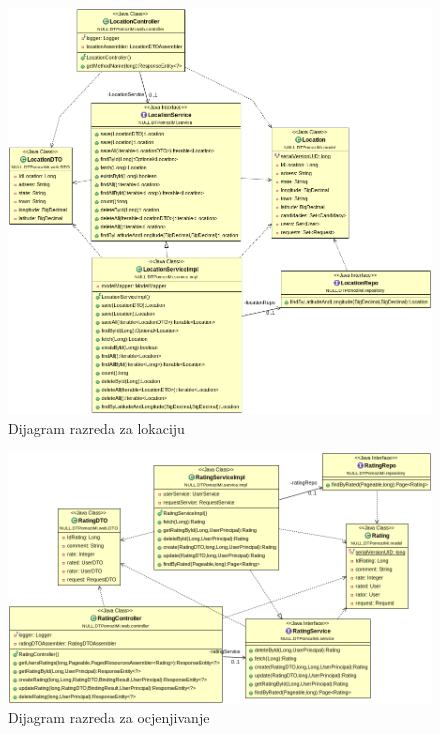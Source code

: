 			
			\begin{figure}[H]
				\includegraphics[scale=0.55]{slike/locationDiag.png} %
				\centering
				\caption { Dijagram razreda za lokaciju}
				\label{fig:4.8}
			\end{figure}
			
			
			\begin{figure}[H]
				\includegraphics[scale=0.55]{slike/ratingDiag.png} %
				\centering
				\caption { Dijagram razreda za ocjenjivanje}
				\label{fig:4.9}
			\end{figure}
		
